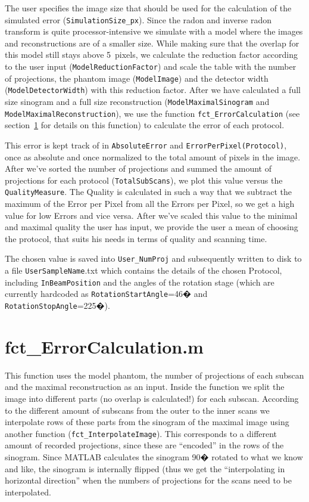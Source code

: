 \documentclass{scrartcl}
\begin{document}
The user specifies the image size that should be used for the calculation of the simulated error (\verb+SimulationSize_px+). Since the radon and inverse radon transform is quite processor-intensive we simulate with a model where the images and reconstructions are of a smaller size. While making sure that the overlap for this model still stays above 5~pixels, we calculate the reduction factor according to the user input (\verb+ModelReductionFactor+) and scale the table with the number of projections, the phantom image (\verb+ModelImage+) and the detector width (\verb+ModelDetectorWidth+) with this reduction factor. After we have calculated a full size sinogram and a full size reconstruction (\verb+ModelMaximalSinogram+ and \verb+ModelMaximalReconstruction+), we use the function \verb+fct_ErrorCalculation+ (see section~\ref{sec:fct_ErrorCalculation} for details on this function) to calculate the error of each protocol.

This error is kept track of in \verb+AbsoluteError+ and \verb+ErrorPerPixel(Protocol)+, once as absolute and once normalized to the total amount of pixels in the image. After we've sorted the number of projections and summed the amount of projections for each protocol (\verb+TotalSubScans+), we plot this value versus the \verb+QualityMeasure+. The Quality is calculated in such a way that we subtract the maximum of the Error per Pixel from all the Errors per Pixel, so we get a high value for low Errors and vice versa. After we've scaled this value to the minimal and maximal quality the user has input, we provide the user a mean of choosing the protocol, that suits his needs in terms of quality and scanning time.

The chosen value is saved into \verb+User_NumProj+ and subsequently written to disk to a file \verb+UserSampleName+.txt which contains the details of the chosen Protocol, including \verb+InBeamPosition+ and the angles of the rotation stage (which are currently hardcoded as \verb+RotationStartAngle+=46� and \verb+RotationStopAngle+=225�).

\section{fct\_ErrorCalculation.m}
\label{sec:fct_ErrorCalculation}
This function uses the model phantom, the number of projections of each subscan and the maximal reconstruction as an input. Inside the function we split the image into different parts (no overlap is calculated!) for each subscan. According to the different amount of subscans from the outer to the inner scans we interpolate rows of these parts from the sinogram of the maximal image using another function (\verb+fct_InterpolateImage+). This corresponds to a different amount of recorded projections, since these are ``encoded'' in the rows of the sinogram. Since MATLAB calculates the sinogram 90� rotated to what we know and like, the sinogram is internally flipped (thus we get the ``interpolating in horizontal direction'' when the numbers of projections for the scans need to be interpolated.
\end{document}
